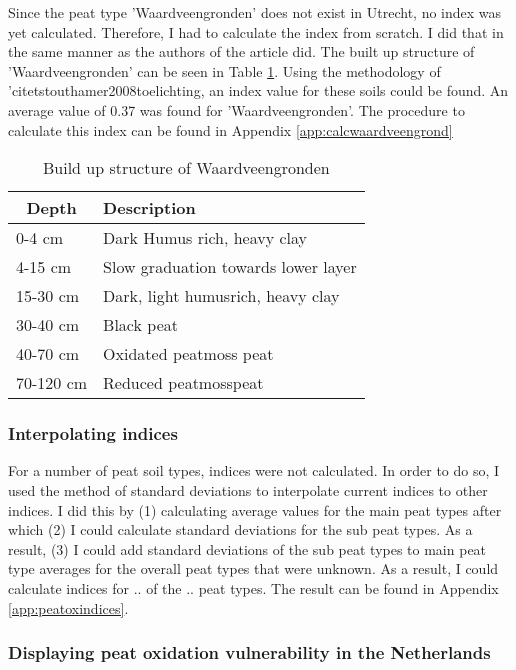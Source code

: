 \documentclass[12pt,a4paper,titlepage]{article}
\begin{document}
Since the peat type 'Waardveengronden' does not exist in Utrecht, no index was yet calculated. Therefore, I had to calculate the index from scratch. I did that in the same manner as the authors of the article did. The built up structure of 'Waardveengronden' can be seen in Table \ref{tab:waardveencalc}. Using the methodology of 'citet{stouthamer2008toelichting}, an index value for these soils could be found. An average value of 0.37 was found for 'Waardveengronden'. The procedure to calculate this index can be found in Appendix \ref{app:calcwaardveengrond}

\begin{table}[htbp]
\caption{Build up structure of Waardveengronden}
\begin{center}
\begin{tabular}{|l|l|}
\hline
\multicolumn{1}{|c|}{\textbf{Depth}} & \textbf{Description} \\ \hline
0-4 cm & Dark Humus rich, heavy clay \\ \hline
4-15 cm & Slow graduation towards lower layer \\ \hline
15-30 cm & Dark, light humusrich, heavy clay \\ \hline
30-40 cm & Black peat \\ \hline
40-70 cm & Oxidated peatmoss peat \\ \hline
70-120 cm & Reduced peatmosspeat \\ \hline
\end{tabular}
\end{center}
\label{tab:waardveencalc}
\end{table}

\subsubsection{Interpolating indices}

For a number of peat soil types, indices were not calculated. In order to do so, I used the method of standard deviations to interpolate current indices to other indices. I did this by (1) calculating average values for the main peat types after which (2) I could calculate standard deviations for the sub peat types. As a result, (3) I could add standard deviations of the sub peat types to main peat type averages for the overall peat types that were unknown. As a result, I could calculate indices for .. of the .. peat types. The result can be found in Appendix \ref{app:peatoxindices}.

\subsubsection{Displaying peat oxidation vulnerability in the Netherlands}
\end{document}
